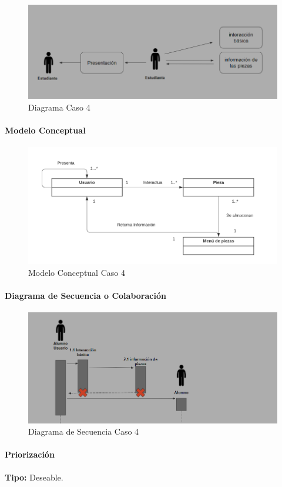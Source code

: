 \begin{figure}[H]
\centerline{\includegraphics[width=15cm]{imgs/CasoUso_4.PNG}}
\caption{Diagrama Caso 4}
\label{fig_4_1}
\end{figure}

\paragraph{Modelo Conceptual}

\begin{figure}[H]
\centerline{\includegraphics[width=15cm]{imgs/ModeloConceptualCaso_4_3.png}}
\caption{Modelo Conceptual Caso 4}
\label{fig_4_2}
\end{figure}


\paragraph{Diagrama de Secuencia o Colaboración}

\begin{figure}[H]
\centerline{\includegraphics[width=15cm]{imgs/CasoUso_4_2.PNG}}
\caption{Diagrama de Secuencia Caso 4}
\label{fig_4_3}
\end{figure}

\paragraph{Priorización}
{\textbf {Tipo:}}
Deseable.